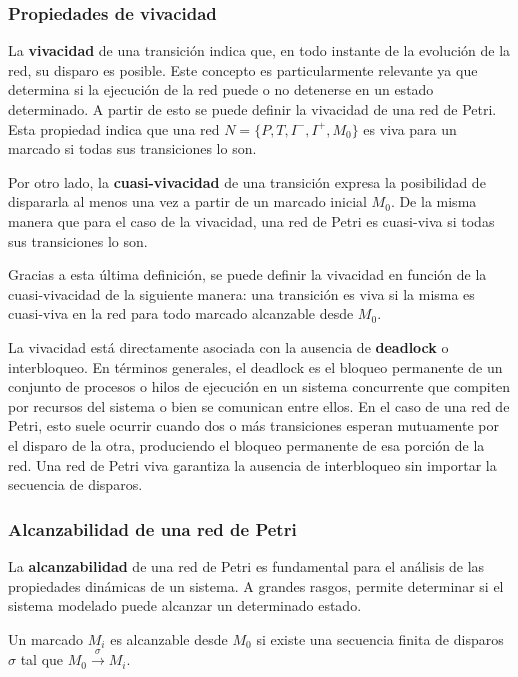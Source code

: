 \subsubsection{Propiedades de vivacidad}
La \textbf{vivacidad} de una transición indica que, en todo instante de la  evolución de la red, su disparo es posible. Este concepto es particularmente relevante ya que determina si la ejecución de la red puede  o no detenerse en un estado determinado. A partir de esto se puede definir la vivacidad de una red de Petri. Esta propiedad indica que una red $N = \{P, T, I^- , I^+ , M_0 \}$ es viva para un marcado si todas sus transiciones lo son.

Por otro lado, la \textbf{cuasi-vivacidad} de una transición expresa la posibilidad de dispararla al menos una vez a partir de un marcado inicial $M_0$. De la misma manera que para el caso de la vivacidad, una red de Petri es cuasi-viva si todas sus transiciones lo son.

Gracias a esta última definición, se puede definir la vivacidad en función de la cuasi-vivacidad de la siguiente manera: una transición es viva si la misma es cuasi-viva en la red para todo marcado alcanzable desde $M_0$. \\ \par

\noindent La vivacidad está directamente asociada con la ausencia de \textbf{deadlock} o interbloqueo. En términos generales, el deadlock es el bloqueo permanente de un conjunto de procesos o hilos de ejecución en un sistema concurrente que compiten por recursos del sistema o bien se comunican entre ellos. En el caso de una red de Petri, esto suele ocurrir cuando dos o más transiciones esperan mutuamente por el disparo de la otra, produciendo el bloqueo permanente de esa porción de la red. 
Una red de Petri viva garantiza la ausencia de interbloqueo sin importar la secuencia de disparos.

\subsubsection{Alcanzabilidad de una red de Petri}
La \textbf{alcanzabilidad} de una red de Petri es fundamental para el análisis de las propiedades dinámicas de un sistema. A grandes rasgos, permite determinar si el sistema modelado puede alcanzar un determinado estado.

Un marcado $M_i$ es alcanzable desde $M_0$ si existe una secuencia finita de disparos $\sigma$ tal que $M_0 \xrightarrow{\sigma} M_i$.

